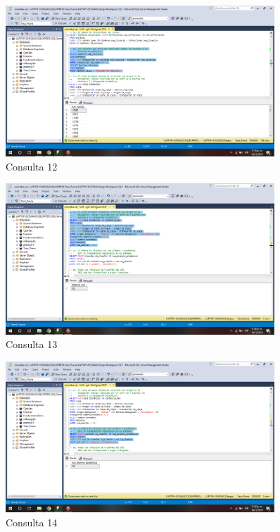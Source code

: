 \documentclass{article}
\begin{document}
\begin{figure}[h]
            \centering
            \includegraphics[width=0.9\textwidth]{img/64.png}
            \caption{Consulta 12}
            \label{fig:my_label12}
        \end{figure}
        
\begin{figure}[h]
            \centering
            \includegraphics[width=0.9\textwidth]{img/65.png}
            \caption{Consulta 13}
            \label{fig:my_label13}
        \end{figure}
        
\begin{figure}[h]
            \centering
            \includegraphics[width=0.9\textwidth]{img/66.png}
            \caption{Consulta 14}
            \label{fig:my_label14}
        \end{figure}
        
\end{document}
